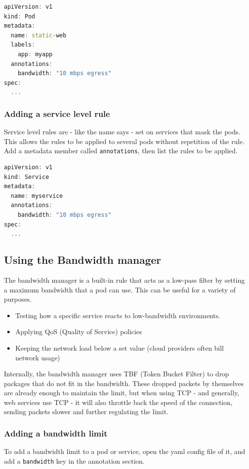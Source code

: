 \begin{lstlisting}[language={C++}]
apiVersion: v1
kind: Pod
metadata:
  name: static-web
  labels:
    app: myapp
  annotations:
    bandwidth: "10 mbps egress"
spec:
  ...
\end{lstlisting}

\subsubsection{Adding a service level rule}
Service level rules are - like the name says - set on services that mask the pods. This allows the rules to be applied to several pods without repetition of the rule. Add a metadata member called \texttt{annotations}, then list the rules to be applied.
\begin{lstlisting}[language={C++}]
apiVersion: v1
kind: Service
metadata:
  name: myservice
  annotations:
    bandwidth: "10 mbps egress"
spec:
  ...
\end{lstlisting}

\newpage
\subsection{Using the Bandwidth manager}
The bandwidth manager is a built-in rule that acts as a low-pass filter by setting a maximum bandwidth that a pod can use. This can be useful for a variety of purposes.
\begin{itemize}
	\item Testing how a specific service reacts to low-bandwidth environments. 
	\item Applying QoS (Quality of Service) policies
	\item Keeping the network load below a set value (cloud providers often bill network usage)
\end{itemize}

\noindent
Internally, the bandwidth manager uses TBF (Token Bucket Filter) to drop packages that do not fit in the bandwidth. These dropped packets by themselves are already enough to maintain the limit, but when using TCP - and generally, web services use TCP - it will also throttle back the speed of the connection, sending packets slower and further regulating the limit.

\subsubsection{Adding a bandwidth limit}
To add a bandwidth limit to a pod or service, open the yaml config file of it, and add a \texttt{bandwidth} key in the annotation section.

